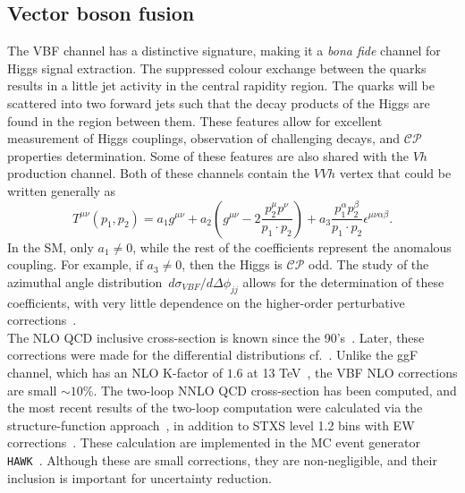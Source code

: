 \subsection{Vector boson fusion}
The VBF channel has a distinctive signature, making it a\textit{ bona fide} channel for Higgs signal extraction. The suppressed colour exchange between the quarks results in a little jet activity in the central rapidity region. The quarks will be scattered into two forward jets such that the decay products of the Higgs are found in the region between them.  These features allow for excellent measurement of Higgs couplings, observation of challenging decays, and $\mathcal{CP}$ properties determination. Some of these features are also shared with the $Vh$ production channel. Both of these channels contain the $VVh$ vertex that could be written generally as~\cite{LHCHiggsCrossSectionWorkingGroup:2016ypw}
\begin{equation}
	T^{\mu \nu}(p_1,p_2) = a_1 g^{\mu \nu}+ a_2  \left(g^{\mu \nu}- 2\frac{p^\mu_{2} p^\nu }{p_1 \cdot p_2} \right)  + a_3 \frac{p_1^\alpha p_2^ \beta}{p_1 \cdot p_2}\epsilon^{\mu \nu \alpha \beta}. 
\end{equation} 
In the SM, only $a_1\neq0$, while the rest of the coefficients represent the anomalous coupling. For example, if $a_3 \neq0$, then the Higgs is  $\mathcal{CP}$ odd. The study of the azimuthal angle distribution~$d \sigma_{VBF} / d \Delta \phi_{jj}$ allows for the determination of these coefficients, with very little dependence on the higher-order perturbative corrections~\cite{hankele2006anomalous}.\\  The NLO QCD inclusive cross-section is known since the 90's~\cite{Han:1992hr}. Later, these corrections were made for the differential distributions cf.~\cite{Figy:2003nv,Berger:2004pca}. Unlike the ggF channel, which has an NLO  K-factor of $1.6$ at 13 TeV~\cite{Gomez-Bock:2007azi}, the VBF NLO corrections are small $\sim 10\%$. The two-loop NNLO QCD cross-section has been computed, and the most recent results of the two-loop computation were calculated via the structure-function approach~\cite{Bolzoni:2010xr}, in addition to STXS level 1.2 bins with EW corrections~\cite{Denner:2014cla}. These calculation are implemented in the MC event generator  \texttt{HAWK}~\cite{Ciccolini:2007jr,Denner:2011id,Denner:2014cla,Denner:2018opp}. Although these are small corrections, they are non-negligible, and their inclusion is important for uncertainty reduction.
